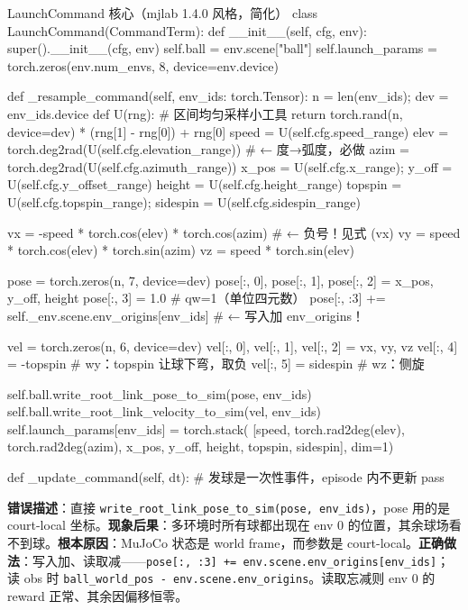 \begin{codebox}[Python]{LaunchCommand 核心（mjlab 1.4.0 风格，简化）}
class LaunchCommand(CommandTerm):
    def __init__(self, cfg, env):
        super().__init__(cfg, env)
        self.ball = env.scene["ball"]
        self.launch_params = torch.zeros(env.num_envs, 8, device=env.device)

    def _resample_command(self, env_ids: torch.Tensor):
        n = len(env_ids); dev = env_ids.device
        def U(rng):  # 区间均匀采样小工具
            return torch.rand(n, device=dev) * (rng[1] - rng[0]) + rng[0]
        speed   = U(self.cfg.speed_range)
        elev    = torch.deg2rad(U(self.cfg.elevation_range))  # ← 度→弧度，必做
        azim    = torch.deg2rad(U(self.cfg.azimuth_range))
        x_pos   = U(self.cfg.x_range);   y_off = U(self.cfg.y_offset_range)
        height  = U(self.cfg.height_range)
        topspin = U(self.cfg.topspin_range); sidespin = U(self.cfg.sidespin_range)

        vx = -speed * torch.cos(elev) * torch.cos(azim)   # ← 负号！见式 (vx)
        vy =  speed * torch.cos(elev) * torch.sin(azim)
        vz =  speed * torch.sin(elev)

        pose = torch.zeros(n, 7, device=dev)
        pose[:, 0], pose[:, 1], pose[:, 2] = x_pos, y_off, height
        pose[:, 3] = 1.0                                   # qw=1（单位四元数）
        pose[:, :3] += self._env.scene.env_origins[env_ids]  # ← 写入加 env_origins！

        vel = torch.zeros(n, 6, device=dev)
        vel[:, 0], vel[:, 1], vel[:, 2] = vx, vy, vz
        vel[:, 4] = -topspin                              # wy：topspin 让球下弯，取负
        vel[:, 5] =  sidespin                             # wz：侧旋

        self.ball.write_root_link_pose_to_sim(pose, env_ids)
        self.ball.write_root_link_velocity_to_sim(vel, env_ids)
        self.launch_params[env_ids] = torch.stack(
            [speed, torch.rad2deg(elev), torch.rad2deg(azim),
             x_pos, y_off, height, topspin, sidespin], dim=1)

    def _update_command(self, dt):  # 发球是一次性事件，episode 内不更新
        pass
\end{codebox}

\begin{pitfall}
\textbf{错误描述}：直接 \verb|write_root_link_pose_to_sim(pose, env_ids)|，pose 用的是 court-local 坐标。\textbf{现象后果}：多环境时所有球都出现在 env 0 的位置，其余球场看不到球。\textbf{根本原因}：MuJoCo 状态是 world frame，而参数是 court-local。\textbf{正确做法}：写入加、读取减——\verb|pose[:, :3] += env.scene.env_origins[env_ids]|；读 obs 时 \verb|ball_world_pos - env.scene.env_origins|。读取忘减则 env 0 的 reward 正常、其余因偏移恒零。
\end{pitfall}


